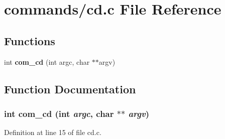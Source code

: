 \section{commands/cd.c File Reference}
\label{cd_8c}
\subsection*{Functions}
\begin{DoxyCompactItemize}
\item 
int {\bf com\_\-cd} (int argc, char $\ast$$\ast$argv)
\end{DoxyCompactItemize}


\subsection{Function Documentation}
\subsubsection[{com\_\-cd}]{\setlength{\rightskip}{0pt plus 5cm}int com\_\-cd (int {\em argc}, \/  char $\ast$$\ast$ {\em argv})}\label{cd_8c_a16dd1645dfe6d641dfb2767c6dc3ec45}


Definition at line 15 of file cd.c.

